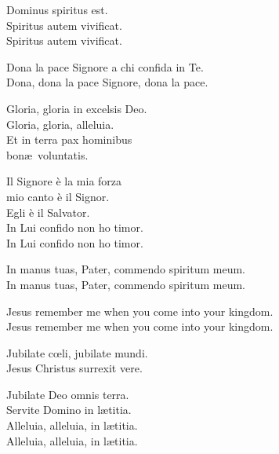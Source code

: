 \spaziotaize


Dominus spiritus est.\\
Spiritus autem vivificat.\\
Spiritus autem vivificat.

\spaziotaize


Dona la pace Signore a chi confida in Te.\\
Dona, dona la pace Signore, dona la pace.

\spaziotaize


Gloria, gloria in excelsis Deo.\\
Gloria, gloria, alleluia.\\
Et in terra pax hominibus\\
bon\ae\ voluntatis.

\spaziotaize


Il Signore è la mia forza\\
mio canto è il Signor.\\
Egli è il Salvator.\\
In Lui confido non ho timor.\\
In Lui confido non ho timor.

\spaziotaize


In manus tuas, Pater, commendo spiritum meum.\\
In manus tuas, Pater, commendo spiritum meum.

\spaziotaize


Jesus remember me when you come into your kingdom.\\
Jesus remember me when you come into your kingdom.

\spaziotaize


Jubilate c\oe li, jubilate mundi.\\
Jesus Christus surrexit vere.

\spaziotaize


Jubilate Deo omnis terra.\\
Servite Domino in l\ae titia.\\
Alleluia, alleluia, in l\ae titia.\\
Alleluia, alleluia, in l\ae titia.

